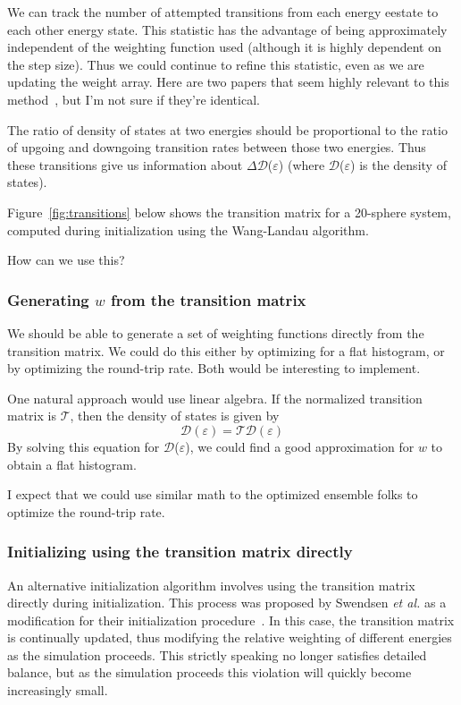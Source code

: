 \documentclass[letterpaper,twocolumn,amsmath,amssymb,pre,aps,10pt]{revtex4-1}
\begin{document}
We can track the number of attempted transitions from each energy
eestate to each other energy state.  This statistic has the advantage of
being approximately independent of the weighting function used
(although it is highly dependent on the step size).  Thus we could
continue to refine this statistic, even as we are updating the weight
array.  Here are two papers that seem highly relevant to this
method~\cite{wang1999transition, wang2002transition}, but I'm not sure
if they're identical.

The ratio of density of states at two energies should be proportional
to the ratio of upgoing and downgoing transition rates between those
two energies.  Thus these transitions give us information about
$\Delta$$\mathcal{D}$($\varepsilon$) (where $\mathcal{D}$($\varepsilon$) 
is the density of states).

Figure~\ref{fig:transitions} below shows the transition matrix for a
20-sphere system, computed during initialization using the Wang-Landau
algorithm.

How can we use this?

\subsubsection{Generating $w$ from the transition matrix}

We should be able to generate a set of weighting functions directly
from the transition matrix.  We could do this either by optimizing for
a flat histogram, or by optimizing the round-trip rate.  Both would be
interesting to implement.

One natural approach would use linear algebra.  If the normalized
transition matrix is $\mathcal{T}$, then the density of states is given by
\begin{equation}
  \mathcal{D}(\varepsilon) = \mathcal{T}\mathcal{D}(\varepsilon) 
\end{equation}
By solving this equation for $\mathcal{D}$($\varepsilon$), we could find a 
good approximation for $w$ to obtain a flat histogram.

I expect that we could use similar math to the optimized ensemble
folks to optimize the round-trip rate.

\subsubsection{Initializing using the transition matrix directly}

An alternative initialization algorithm involves using the transition
matrix directly during initialization.  This process was proposed by
Swendsen \emph{et al.} as a modification for their initialization
procedure~\cite{swendsen1999transition}.  In this case, the transition
matrix is continually updated, thus modifying the relative weighting
of different energies as the simulation proceeds.  This strictly
speaking no longer satisfies detailed balance, but as the simulation
proceeds this violation will quickly become increasingly small.
\end{document}
